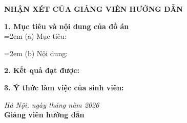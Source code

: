 
\pagestyle{empty} 
\noindent
\begin{tcolorbox}[
    enhanced,
    height=0.95\textheight,
    colback=white,      
    colframe=black,     
    boxrule=0.4pt,      
    sharp corners,
    bottom=30cm,
]

\begin{center}
{\Large\bfseries NHẬN XÉT CỦA GIẢNG VIÊN HƯỚNG DẪN \par}
\end{center}
\vspace{0.25cm} 

\begin{flushleft} 
\large 

\textbf{1. Mục tiêu và nội dung của đồ án}
\vspace{0.4cm}\\
\hangindent=2em (a) Mục tiêu: \dotfill
\par\dotfill
\par\dotfill

\vspace{0.6cm}
\hangindent=2em (b) Nội dung: \dotfill
\par\dotfill
\par\dotfill
\par\dotfill

\vspace{0.8cm}
\textbf{2. Kết quả đạt được:}
\par\dotfill
\par\dotfill
\par\dotfill
\par\dotfill

\vspace{0.8cm}
\textbf{3. Ý thức làm việc của sinh viên:}
\par\dotfill
\par\dotfill
\par\dotfill
\par\dotfill

\end{flushleft}


\begin{flushright} 
    \textit{Hà Nội, ngày \hspace{1cm} tháng \hspace{1cm} năm 2026} \\[0.2cm]
    \textbf{Giảng viên hướng dẫn} \\[2cm]
\end{flushright}

\vspace{5cm}

\end{tcolorbox}